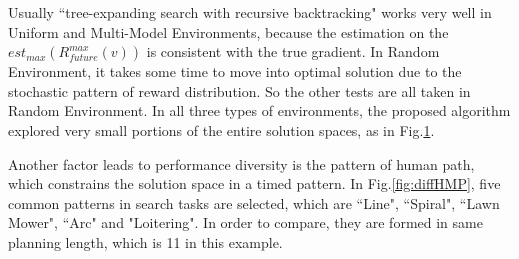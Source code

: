 \documentclass[12pt]{article}
\begin{document}
\begin{figure}[H]
  \caption{} 
  \label{fig:diffEnv} %
\end{figure}

Usually ``tree-expanding search with recursive backtracking" works very well in Uniform and Multi-Model Environments, because the estimation on the $ est_{max}(R^{max}_{future}(v)) $ is consistent with the true gradient. In Random Environment, it takes some time to move into optimal solution due to the stochastic pattern of reward distribution. So the other tests are all taken in Random Environment. In all three types of environments, the proposed algorithm explored very small portions of the entire solution spaces, as in Fig.\ref{fig:diffEnv}.

Another factor leads to performance diversity is the pattern of human path, which constrains the solution space in a timed pattern. In Fig.\ref{fig:diffHMP}, five common patterns in search tasks are selected, which are ``Line", ``Spiral", ``Lawn Mower", ``Arc" and "Loitering". In order to compare, they are formed in same planning length, which is 11 in this example. 
\end{document}
